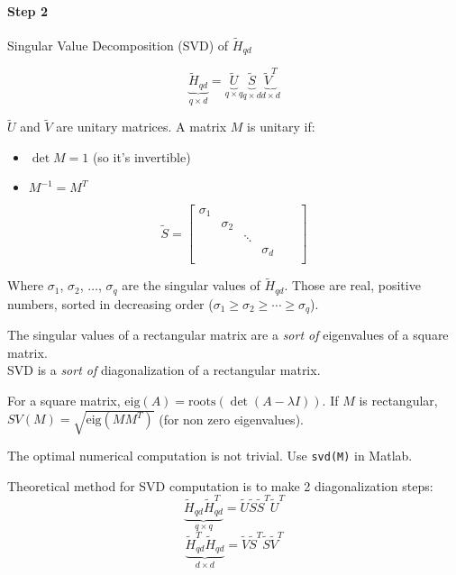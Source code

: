 
\paragraph{Step 2} Singular Value Decomposition (SVD) of $\tilde{H}_{qd}$

\[
    \underbrace{\tilde{H}_{qd}}_{q\times d} = \underbrace{\tilde{U}}_{q\times q} \underbrace{\tilde{S}}_{q\times d} \underbrace{\tilde{V}^T}_{d\times d}
\]

$\tilde{U}$ and $\tilde{V}$ are unitary matrices. A matrix $M$ is unitary if:
\begin{itemize}
    \item $\det M = 1$ (so it's invertible)
    \item $M^{-1} = M^T$
\end{itemize}

\[
    \tilde{S} = \begin{bmatrix}
        \sigma_1 & & & & &\\
        & \sigma_2 & & & &\\
        & & \ddots & & &\\
        & &  & \sigma_d & &\\
    \end{bmatrix}
\]

Where $\sigma_1$, $\sigma_2$, $\ldots$, $\sigma_q$ are the singular values of $\tilde{H}_{qd}$.
Those are real, positive numbers, sorted in decreasing order ($\sigma_1 \ge \sigma_2 \ge \cdots \ge \sigma_q$).

\begin{rem}
    The singular values of a rectangular matrix are a \emph{sort of} eigenvalues of a square matrix.\\
    SVD is a \emph{sort of} diagonalization of a rectangular matrix.
\end{rem}

\begin{rem}
    For a square matrix, $\text{eig}(A) = \text{roots}(\det(A-\lambda I))$. If $M$ is rectangular, $SV(M) = \sqrt{\text{eig}(MM^T)}$ (for non zero eigenvalues).
\end{rem}

\begin{rem}
    The optimal numerical computation is not trivial. Use \texttt{svd(M)} in Matlab.

    Theoretical method for SVD computation is to make 2 diagonalization steps:
    \[
        \underbrace{\tilde{H}_{qd} \tilde{H}_{qd}^T}_{q\times q} = \tilde{U}\tilde{S}\tilde{S}^T\tilde{U}^T
    \]
    \[
        \underbrace{\tilde{H}_{qd}^T \tilde{H}_{qd}}_{d\times d} = \tilde{V}\tilde{S}^T\tilde{S}\tilde{V}^T
    \]
\end{rem}

